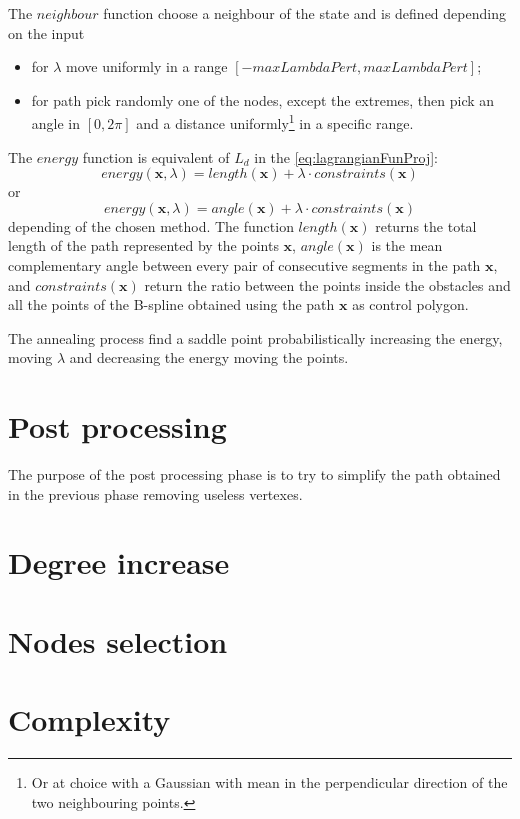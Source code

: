 \documentclass[dissertation.tex]{subfiles}
\begin{document}
The $neighbour$ function choose a neighbour of the state and is
defined depending on the input
\begin{itemize}
  \item for $\lambda$ move uniformly in a range $[-maxLambdaPert, maxLambdaPert]$;
  \item for path pick randomly one of the nodes, except the extremes,
    then pick an angle in $[0,2\pi]$ and a distance
    uniformly\footnote{Or at choice with a
      Gaussian with mean in the perpendicular direction of the two
      neighbouring points.} in a specific range.
\end{itemize}

The $energy$ function is equivalent of $L_d$ in the
\cref{eq:lagrangianFunProj}:
$$energy(\mathbf{x},\lambda)=length(\mathbf{x})+\lambda\cdot
constraints(\mathbf{x})$$
or
$$energy(\mathbf{x},\lambda)=angle(\mathbf{x})+\lambda\cdot
constraints(\mathbf{x})$$
depending of the chosen method. The function $length(\mathbf{x})$
returns the total length of the path represented by the points
$\mathbf{x}$, $angle(\mathbf{x})$ is the mean complementary angle between
every pair of consecutive segments in the path $\mathbf{x}$, and
$constraints(\mathbf{x})$ return the ratio between the points inside the
obstacles and all the points of the
B-spline obtained using the path $\mathbf{x}$ as control polygon.

The annealing process
find a saddle point probabilistically increasing the energy, moving
$\lambda$ and 
decreasing the energy moving the points.


\section{Post processing}\label{sec:postPro}
The purpose of the post processing phase is to try to simplify the
path obtained in the previous phase removing useless vertexes.
\section{Degree increase}\label{sec:degreeInc}
\section{Nodes selection}\label{sec:nodeSel}
\section{Complexity}
\end{document}
